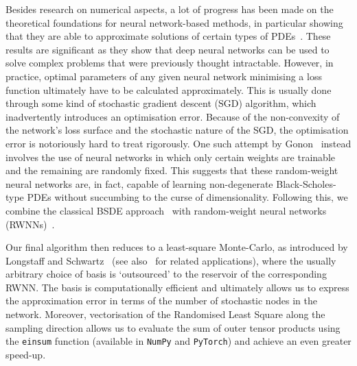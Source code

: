 Besides research on numerical aspects, a lot of progress has been made on the theoretical foundations for neural network-based methods, 
in particular showing that they are able to approximate solutions of certain types of PDEs~\cite{Elbrachter2021DNNPricing, Hutzenthaler2020AEquations, Reisinger2020RectifiedSystems, Gonon2023DeepEquations}. 
These results are significant as they show that deep neural networks can be used to solve complex problems that were previously thought intractable. 
However, in practice, optimal parameters of any given neural network minimising a loss function ultimately have to be calculated approximately. This is usually done through some kind of stochastic gradient descent (SGD) algorithm, which inadvertently introduces an optimisation error. Because of the non-convexity of the network's loss surface and the stochastic nature of the SGD, the optimisation error is notoriously hard to treat rigorously. 
One such attempt by Gonon~\cite{Gonon2021RandomDimensionality} instead involves the use of neural networks in which only certain weights are trainable and the remaining are randomly fixed. 
This suggests that these random-weight neural networks are, in fact, capable of learning non-degenerate Black-Scholes-type PDEs without succumbing to the curse of dimensionality. Following this, we combine the classical BSDE approach~\cite{Pardoux1990AdaptedEquation, Briand2003LpEquations} with random-weight neural networks (RWNNs)~\cite{Huang2006UniversalNodes, Rahimi2007RandomMachines, Rahimi2008WeightedLearning}.

Our final algorithm then reduces to a least-square Monte-Carlo, as introduced by Longstaff and Schwartz~\cite{Longstaff2001ValuingApproach} (see also~\cite{Anker2017SDEPDEs} for related applications), where the usually arbitrary choice of basis is `outsourced' to the reservoir of the corresponding RWNN. The basis is computationally efficient and ultimately allows us to express the approximation error in terms of the number of stochastic nodes in the network. Moreover, vectorisation of the Randomised Least Square along the sampling direction allows us to evaluate the sum of outer tensor products using the \texttt{einsum} function (available in \texttt{NumPy} and \texttt{PyTorch}) and achieve an even greater speed-up. 

